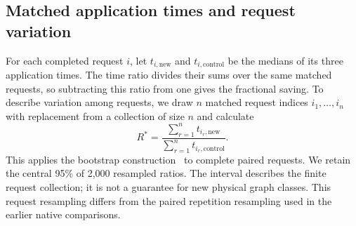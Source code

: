 \subsection{Matched application times and request variation}
For each completed request $i$, let $t_{i,\mathrm{new}}$ and $t_{i,\mathrm{control}}$ be the medians of its three application times. The time ratio divides their sums over the same matched requests, so subtracting this ratio from one gives the fractional saving. To describe variation among requests, we draw $n$ matched request indices $i_1,\ldots,i_n$ with replacement from a collection of size $n$ and calculate
\begin{equation}
 R^*=\frac{\sum_{r=1}^{n}t_{i_r,\mathrm{new}}}
 {\sum_{r=1}^{n}t_{i_r,\mathrm{control}}}.
 \label{eq:notes-loop-tree-resampling}
\end{equation}
This applies the bootstrap construction~\cite{Efron1979} to complete paired requests. We retain the central 95\% of 2,000 resampled ratios. The interval describes the finite request collection; it is not a guarantee for new physical graph classes. This request resampling differs from the paired repetition resampling used in the earlier native comparisons.
